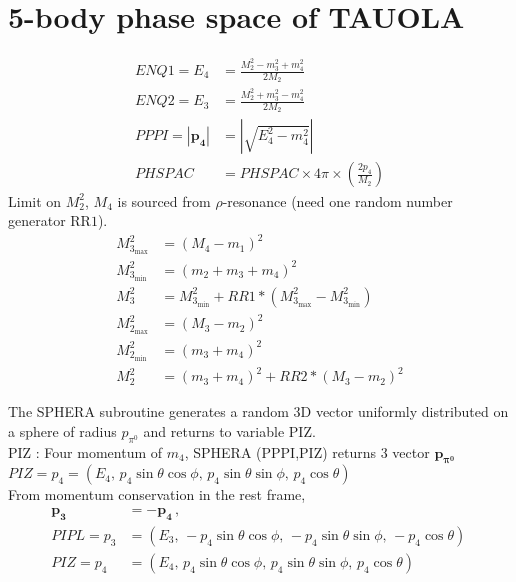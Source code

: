 \documentclass[12pt]{article}
\begin{document}
\newpage
{\color{blue}
\section{5-body phase space of TAUOLA}
\begin{align}
    ENQ1 = E_{4} &= \frac{M_{2}^2- m_{3}^2+m_{4}^2}{2M_{2}} \\
ENQ2=E_{3} &= \frac{M_{2}^2+ m_{3}^2-m_{4}^2}{2M_{2}} \\
PPPI= |\mathbf{p_{4}}| &= |\sqrt{E_{4}^2 - m_{4}^2}| \\
PHSPAC &= PHSPAC \times 4\pi \times (\frac{2 p_{4}}{M_{2}})
\end{align}
Limit on $M_2^2$, $M_4$ is sourced from $\rho$-resonance (need one random number generator $\text{RR1}$).
\begin{align}
    M_{3_{\text{max}}}^2 &= (M_4 - m_1)^2 \\
     M_{3_{\text{min}}}^2 &= (m_2 + m_3 + m_4)^2
      \\
     M_3^2 &=  M_{3_{\text{min}}}^2 + RR1 * ( M_{3_{\text{max}}}^2 -  M_{3_{\text{min}}}^2) \\
    M_{2_{\text{max}}}^2 &= (M_3 - m_2)^2 \\
    M_{2_{\text{min}}}^2 &= (m_3 + m_4)^2 \\
    M_2^2 &= (m_3+m_4)^2 + RR2 * (M_3 - m_2)^2
\end{align}


The SPHERA subroutine generates a random 3D vector uniformly distributed on a sphere of radius $p_{\pi^0}$ and returns to variable PIZ.\\
 PIZ :  Four momentum of $m_4$, SPHERA (PPPI,PIZ) returns 3 vector $\mathbf{p_{\pi^0}}$\\
$PIZ = p_{4} = (E_{4}, \, p_{4} \sin{\theta} \cos{\phi}, \, p_{4} \sin{\theta} \sin{\phi}, \,  p_{4} \cos{\theta} )$\\
From momentum conservation in the rest frame,
\begin{align}
   \mathbf{p_3} &= -\mathbf{p_4} \,, \\
  PIPL =  p_{3} &=  (E_{3}, \,- p_{4} \sin{\theta} \cos{\phi}, \, -p_{4} \sin{\theta} \sin{\phi}, \, - p_{4} \cos{\theta}  ) \,\\
  PIZ = p_{4} &= (E_{4}, \, p_{4} \sin{\theta} \cos{\phi}, \, p_{4} \sin{\theta} \sin{\phi}, \,  p_{4} \cos{\theta} )
\end{align}


}
\end{document}
